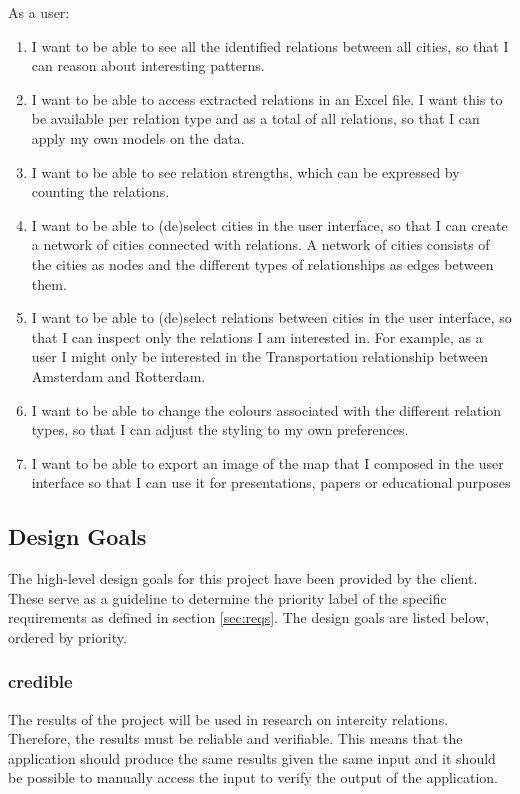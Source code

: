 As a user:
\begin{enumerate}
    \item I want to be able to see all the identified relations between all cities, so that I can reason about interesting patterns.
    \item I want to be able to access extracted relations in an Excel file. I want this to be available per relation type and as a total of all relations, so that I can apply my own models on the data.
    \item I want to be able to see relation strengths, which can be expressed by counting the relations.
    \item I want to be able to (de)select cities in the user interface, so that I can create a network of cities connected with relations. A network of cities consists of the cities as nodes and the different types of relationships as edges between them.
    \item I want to be able to (de)select relations between cities in the user interface, so that I can inspect only the relations I am interested in. For example, as a user I might only be interested in the Transportation relationship between Amsterdam and Rotterdam.
    \item I want to be able to change the colours associated with the different relation types, so that I can adjust the styling to my own preferences.
    \item I want to be able to export an image of the map that I composed in the user interface so that I can use it for presentations, papers or educational purposes
\end{enumerate}

\subsection{Design Goals} \label{sec:design-goals}
The high-level design goals for this project have been provided by the client. These serve as a guideline to determine the priority label of the specific requirements as defined in section \ref{sec:reqs}. The design goals are listed below, ordered by priority.

\subsubsection{credible} The results of the project will be used in research on intercity relations. Therefore, the results must be reliable and verifiable. This means that the application should produce the same results given the same input and it should be possible to manually access the input to verify the output of the application.
